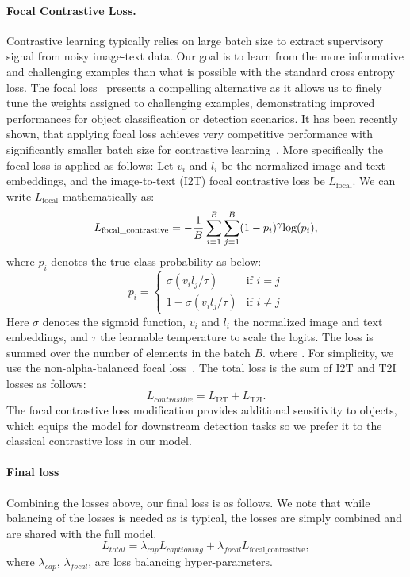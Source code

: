 \documentclass[10pt]{article} \usepackage[accepted]{tmlr}
\begin{document}
\paragraph{Focal Contrastive Loss.}\quad
Contrastive learning typically relies on large batch size to extract supervisory signal from noisy image-text data. Our goal is to learn from the more informative and challenging examples than what is possible with the standard cross entropy loss. The focal loss~\citep{lin2017focal} presents a compelling alternative as it allows us to finely tune the weights assigned to challenging examples, demonstrating improved performances for object classification or detection scenarios. It has been recently shown, that applying focal loss achieves very competitive performance with significantly smaller batch size for contrastive learning~\citep{rovit}. More specifically the focal loss is applied as follows: Let $v_i$ and $l_i$ be the normalized image and text embeddings, and the image-to-text (I2T) focal contrastive loss be $L_\text{focal}$. We can write $L_\text{focal}$ mathematically as:
\begin{equation}\label{eq:focal}
L_{\text{focal\_contrastive}} = -{1 \over {B}} \sum_{i=1}^{B} \sum_{j=1}^{B} (1- p_{i})^{\gamma} \text{log}(p_{i}),
\end{equation}
where $p_i$ denotes the true class probability as below:
\begin{equation}
p_{i} =
    \begin{cases}
        \sigma(v_{i} l_{j} / \tau) & \text{if } i = j\\
        1 - \sigma(v_{i} l_{j} / \tau) & \text{if } i \neq j
    \end{cases}
\end{equation}
Here $\sigma$ denotes the sigmoid function, $v_i$ and $l_i$ the normalized image and text embeddings, and $\tau$ the learnable temperature to scale the logits. The loss is summed over the number of elements in the batch $B$.
where . For simplicity, we use the non-alpha-balanced focal loss~\citep{lin2017focal}. The total loss is the sum of I2T and T2I losses as follows:
\begin{equation}\label{eqn:contrastive}
L_{contrastive} = L_{\text{I2T}} + L_{\text{T2I}}.
\end{equation}
The focal contrastive loss modification provides additional sensitivity to objects, which equips the model for downstream detection tasks so we prefer it to the classical contrastive loss in our model.

\paragraph{Final loss} \quad Combining the losses above, our final loss is as follows. We note that while balancing of the losses is needed as is typical, the losses are simply combined and are shared with the full model.
\begin{equation}\label{eqn:combine}
    L_{total} = \lambda_{cap}L_{captioning} + \lambda_{focal}L_{\text{focal\_contrastive}},
\end{equation}
where $\lambda_{cap}$, $\lambda_{focal}$, are loss balancing hyper-parameters.
\end{document}

